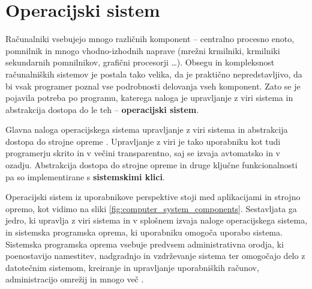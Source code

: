 \documentclass[a4paper,12pt,openright]{book}
\begin{document}
\section{Operacijski sistem}

Računalniki vsebujejo mnogo različnih komponent -- centralno procesno enoto, pomnilnik in mnogo vhodno-izhodnih naprave (mrežni krmilniki, krmilniki sekundarnih pomnilnikov, grafični procesorji \dots).
Obsegu in kompleksnost računalniških sistemov je postala tako velika, da je praktično nepredstavljivo, da bi vsak programer poznal vse podrobnosti delovanja vseh komponent.
Zato se je pojavila potreba po programu, katerega naloga je upravljanje z viri sistema in abstrakcija dostopa do le teh -- \textbf{operacijski sistem}.

Glavna naloga operacijskega sistema upravljanje z viri sistema in abstrakcija dostopa do strojne opreme \cite{Tanenbaum_Bos_2023}.
Upravljanje z viri je tako uporabniku kot tudi programerju skrito in v večini transparentno, saj se izvaja avtomatsko in v ozadju.
Abstrakcija dostopa do strojne opreme in druge ključne funkcionalnosti pa so implementirane s \textbf{sistemskimi klici}.

Operacijski sistem iz uporabnikove perspektive stoji med aplikacijami in strojno opremo, kot vidimo na sliki \ref{fig:computer_system_components}.
Sestavljata ga jedro, ki upravlja z viri sistema in v splošnem izvaja naloge operacijskega sistema, in sistemska programska oprema, ki uporabniku omogoča uporabo sistema.
Sistemska programska oprema vsebuje predvsem administrativna orodja, ki poenostavijo namestitev, nadgradnjo in vzdrževanje sistema ter omogočajo delo z datotečnim sistemom, kreiranje in upravljanje uporabniških računov, administracijo omrežij in mnogo več \cite{Silberschatz_Galvin_Gagne_2018}.
\end{document}
